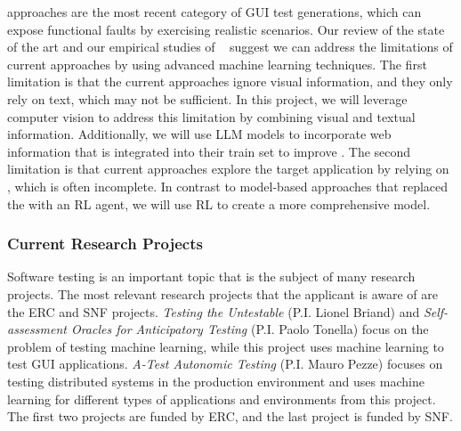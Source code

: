 
\smallskip 
\testreuse approaches are the most recent category of GUI test generations, which can expose functional faults by exercising realistic scenarios. Our review of the state of the art and our empirical studies of \testreuse~\cite{mariani:SemFinder:ISSTA:2021,khalili:DomainEmbedding:ICPC:2022} suggest we can address the limitations of current approaches by using advanced machine learning techniques. 
The first limitation is that the current \testreuse approaches ignore visual information, and they only rely on text, which may not be sufficient. 
In this project, we will leverage computer vision to address this limitation by combining visual and textual information.
Additionally, we will use LLM models to incorporate web information that is integrated into their train set to improve \testreuse. 
The second limitation is that current approaches explore the target application by relying on \tam, which is often incomplete.
In contrast to model-based approaches that replaced the \tam with an RL agent, we will use RL to create a more comprehensive model.


\subsubsection{Current Research Projects}

Software testing is an important topic that is the subject of many research projects. The most relevant research projects that the applicant is aware of are the ERC and SNF projects. \textit{Testing the Untestable} (P.I. Lionel Briand) and \textit{Self-assessment Oracles for Anticipatory Testing} (P.I. Paolo Tonella) focus on the problem of testing machine learning, while this project uses machine learning to test GUI applications. \textit{A-Test Autonomic Testing} (P.I. Mauro Pezze) focuses on testing distributed systems in the production environment and uses machine learning for different types of applications and environments from this project. The first two projects are funded by ERC, and the last project is funded by SNF. 


